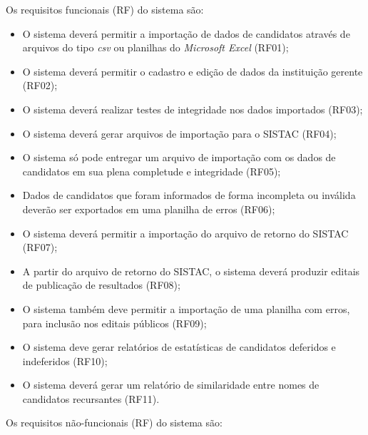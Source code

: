 \documentclass[
	12pt,			%
	openright,		%
	oneside,	
	a4paper,		%
	english,		%
	brazil			%
]{abntex2/abntex2}  %
\begin{document}
	Os requisitos funcionais (RF) do sistema são:
	
	\begin{itemize}

		\item O sistema deverá permitir a importação de dados de candidatos através de arquivos do tipo \textit{csv} ou planilhas do \textit{Microsoft Excel} (RF01);
		\item O sistema deverá permitir o cadastro e edição de dados da instituição gerente (RF02);
		\item O sistema deverá realizar testes de integridade nos dados importados (RF03);
		\item O sistema deverá gerar arquivos de importação para o SISTAC (RF04);
		\item O sistema só pode entregar um arquivo de importação com os dados de candidatos em sua plena completude e integridade (RF05);
		\item Dados de candidatos que foram informados de forma incompleta ou inválida deverão ser exportados em uma planilha de erros (RF06);
		\item O sistema deverá permitir a importação do arquivo de retorno do SISTAC (RF07);
		\item A partir do arquivo de retorno do SISTAC, o sistema deverá produzir editais de publicação de resultados (RF08);
		\item O sistema também deve permitir a importação de uma planilha com erros, para inclusão nos editais públicos (RF09);
		\item O sistema deve gerar relatórios de estatísticas de candidatos deferidos e indeferidos (RF10);
		\item O sistema deverá gerar um relatório de similaridade entre nomes de candidatos recursantes (RF11).
		
	\end{itemize}
	
	Os requisitos não-funcionais (RF) do sistema são:
	
\end{document}

